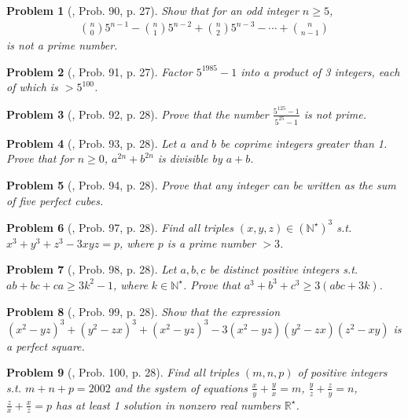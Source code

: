 \documentclass[oneside]{book}
\numberwithin{equation}{section}
\newtheorem{problem}{Problem}[section]
\begin{document}
\begin{problem}[\cite{Gelca_Andreescu2017}, Prob. 90, p. 27]
	Show that for an odd integer $n\ge 5$,
	\begin{align}
		\binom{n}{0}5^{n-1} - \binom{n}{1}5^{n-2} + \binom{n}{2}5^{n-3} - \cdots + \binom{n}{n - 1}
	\end{align}
	is not a prime number.
\end{problem}

\begin{problem}[\cite{Gelca_Andreescu2017}, Prob. 91, p. 27]
	Factor $5^{1985} - 1$ into a product of 3 integers, each of which is $> 5^{100}$.
\end{problem}

\begin{problem}[\cite{Gelca_Andreescu2017}, Prob. 92, p. 28]
	Prove that the number $\frac{5^{125} - 1}{5^{25} - 1}$ is not prime.
\end{problem}

\begin{problem}[\cite{Gelca_Andreescu2017}, Prob. 93, p. 28]
	Let $a$ and $b$ be coprime integers greater than 1. Prove that for $n\ge 0$, $a^{2n} + b^{2n}$ is divisible by $a + b$.
\end{problem}

\begin{problem}[\cite{Gelca_Andreescu2017}, Prob. 94, p. 28]
	Prove that any integer can be written as the sum of five perfect cubes.
\end{problem}

\begin{problem}[\cite{Gelca_Andreescu2017}, Prob. 97, p. 28]
	Find all triples $(x,y,z)\in(\mathbb{N}^\star)^3$ s.t. $x^3 + y^3 + z^3 - 3xyz = p$, where $p$ is a prime number $> 3$.
\end{problem}

\begin{problem}[\cite{Gelca_Andreescu2017}, Prob. 98, p. 28]
	Let $a,b,c$ be distinct positive integers s.t. $ab + bc + ca\ge 3k^2 - 1$, where $k\in\mathbb{N}^\star$. Prove that $a^3 + b^3 + c^3\ge 3(abc + 3k)$.
\end{problem}

\begin{problem}[\cite{Gelca_Andreescu2017}, Prob. 99, p. 28]
	Show that the expression $(x^2 - yz)^3 + (y^2 - zx)^3 + (x^2 - yz)^3 - 3(x^2 - yz)(y^2 - zx)(z^2 - xy)$ is a perfect square.
\end{problem}

\begin{problem}[\cite{Gelca_Andreescu2017}, Prob. 100, p. 28]
	Find all triples $(m,n,p)$ of positive integers s.t. $m + n + p = 2002$ and the system of equations $\frac{x}{y} + \frac{y}{x} = m$, $\frac{y}{z} + \frac{z}{y} = n$, $\frac{z}{x} + \frac{x}{z} = p$ has at least 1 solution in nonzero real numbers $\mathbb{R}^\star$.
\end{problem}	
\end{document}
